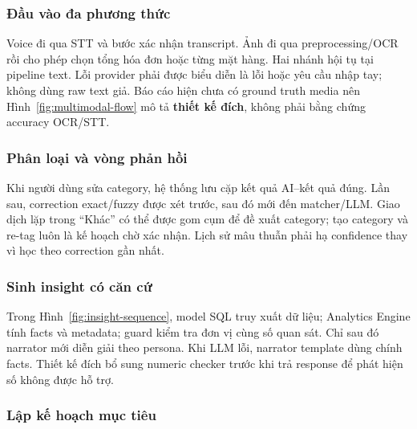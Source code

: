 \subsubsection{Đầu vào đa phương thức}


Voice đi qua STT và bước xác nhận transcript. Ảnh đi qua preprocessing/OCR rồi cho phép chọn tổng hóa đơn hoặc từng mặt hàng. Hai nhánh hội tụ tại pipeline text. Lỗi provider phải được biểu diễn là lỗi hoặc yêu cầu nhập tay; không dùng raw text giả. Báo cáo hiện chưa có ground truth media nên Hình~\ref{fig:multimodal-flow} mô tả \textbf{thiết kế đích}, không phải bằng chứng accuracy OCR/STT.

\subsubsection{Phân loại và vòng phản hồi}


Khi người dùng sửa category, hệ thống lưu cặp kết quả AI--kết quả đúng. Lần sau, correction exact/fuzzy được xét trước, sau đó mới đến matcher/LLM. Giao dịch lặp trong ``Khác'' có thể được gom cụm để đề xuất category; tạo category và re-tag luôn là kế hoạch chờ xác nhận. Lịch sử mâu thuẫn phải hạ confidence thay vì học theo correction gần nhất.

\subsubsection{Sinh insight có căn cứ}


Trong Hình~\ref{fig:insight-sequence}, model SQL truy xuất dữ liệu; Analytics Engine tính facts và metadata; guard kiểm tra đơn vị cùng số quan sát. Chỉ sau đó narrator mới diễn giải theo persona. Khi LLM lỗi, narrator template dùng chính facts. Thiết kế đích bổ sung numeric checker trước khi trả response để phát hiện số không được hỗ trợ.

\subsubsection{Lập kế hoạch mục tiêu}

